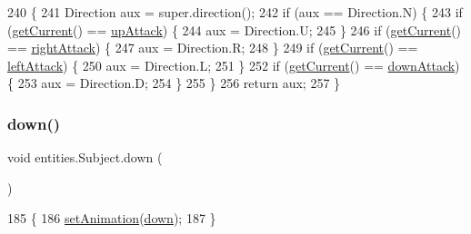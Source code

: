 \begin{DoxyCode}
240                                  \{
241         Direction aux = super.direction();
242         \textcolor{keywordflow}{if} (aux == Direction.N) \{
243             \textcolor{keywordflow}{if} (\mbox{\hyperlink{classentities_1_1_animated_sprite_entity_a49847fd77527b5805401b6900a4b0633}{getCurrent}}() == \mbox{\hyperlink{classentities_1_1_subject_ab5b8390d2291803a2174b7ae146f86ac}{upAttack}}) \{
244                 aux = Direction.U;
245             \}
246             \textcolor{keywordflow}{if} (\mbox{\hyperlink{classentities_1_1_animated_sprite_entity_a49847fd77527b5805401b6900a4b0633}{getCurrent}}() == \mbox{\hyperlink{classentities_1_1_subject_aab2192306daae64078eba6d19699bcf0}{rightAttack}}) \{
247                 aux = Direction.R;
248             \}
249             \textcolor{keywordflow}{if} (\mbox{\hyperlink{classentities_1_1_animated_sprite_entity_a49847fd77527b5805401b6900a4b0633}{getCurrent}}() == \mbox{\hyperlink{classentities_1_1_subject_ab40f0af736007eb0a7ba1ee89765225a}{leftAttack}}) \{
250                 aux = Direction.L;
251             \}
252             \textcolor{keywordflow}{if} (\mbox{\hyperlink{classentities_1_1_animated_sprite_entity_a49847fd77527b5805401b6900a4b0633}{getCurrent}}() == \mbox{\hyperlink{classentities_1_1_subject_a5b0e607cea5f2a64d7e7f53035995b7b}{downAttack}}) \{
253                 aux = Direction.D;
254             \}
255         \}
256         \textcolor{keywordflow}{return} aux;
257     \}
\end{DoxyCode}
\mbox{\label{classentities_1_1_subject_acf3cbe158b93cc059365ae49dec13572}} 
\subsubsection{\texorpdfstring{down()}{down()}}
{\footnotesize\ttfamily void entities.\+Subject.\+down (\begin{DoxyParamCaption}{ }\end{DoxyParamCaption})\hspace{0.3cm}{\ttfamily [inline]}}


\begin{DoxyCode}
185                        \{
186         \mbox{\hyperlink{classentities_1_1_animated_sprite_entity_a089bd746df0d8a9d5687240bb34af2dc}{setAnimation}}(\mbox{\hyperlink{classentities_1_1_subject_acf3cbe158b93cc059365ae49dec13572}{down}});
187     \}
\end{DoxyCode}
\mbox{\label{classentities_1_1_subject_ad6e17bb9c3f58a5052f553ef5a64f931}} 
